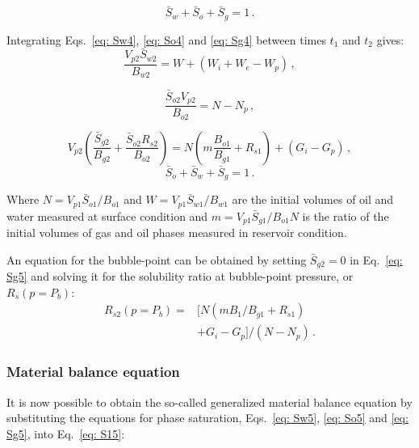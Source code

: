\documentclass[authoryear,preprint,review,11pt]{elsarticle}
\begin{document}
\begin{equation}\label{eq: S14}
\bar{S}_w+\bar{S}_o+\bar{S}_g=1 \, .
\end{equation}

Integrating Eqs.~\eqref{eq: Sw4}, \eqref{eq: So4} and \eqref{eq: Sg4} between times $t_1$ and $t_2$ gives:
\begin{equation}\label{eq: Sw5}
\frac{V_{p2} \bar{S}_{w2}}{B_{w2}}=W+\left(W_i+W_e-W_p\right) \, ,
\end{equation}

\begin{equation}\label{eq: So5}
\frac{\bar{S}_{o2} V_{p2}}{B_{o2}} = N-N_p \, ,
\end{equation}

\begin{equation}\label{eq: Sg5}
V_{p2}\left(\frac{\bar{S}_{g2}}{B_{g2}} +\frac{\bar{S}_{o2} R_{s2}}{B_{o2}}\right) = N\left(m\frac{B_{o1}}{B_{g1}} + R_{s1}\right) +\left(G_i-G_p\right) \, ,
\end{equation}
%
\begin{equation}\label{eq: S15}
\bar{S}_o+\bar{S}_w+\bar{S}_g=1 \, .
\end{equation}

Where $N=V_{p1} \bar{S}_{o1}/B_{o1}$ and $W=V_{p1} \bar{S}_{w1}/B_{w1}$ are the initial volumes of oil and water measured at surface condition and $m=V_{p1} \bar{S}_{g1}/B_{o1} N$ is the ratio of the initial volumes of gas and oil phases measured in reservoir condition.

An equation for the bubble-point can be obtained by setting $\bar{S}_{g2}=0$ in Eq.~\eqref{eq: Sg5} and solving it for the solubility ratio at bubble-point pressure, or $R_s(p=P_b)$:
\begin{equation}\label{eq: eqPb}
\begin{split}
R_{s2}\left(p=P_b\right) = &\Big[N\left(m B_{1}/B_{g1} +R_{s1}\right)\\
&+G_i-G_p\Big]/\left(N-N_p\right) \, .
\end{split}
\end{equation}

\subsubsection{Material balance equation}

It is now possible to obtain the so-called generalized material balance equation by substituting the equations for phase saturation, Eqs.~\eqref{eq: Sw5}, \eqref{eq: So5} and \eqref{eq: Sg5}, into Eq.~\eqref{eq: S15}:  
\end{document}

